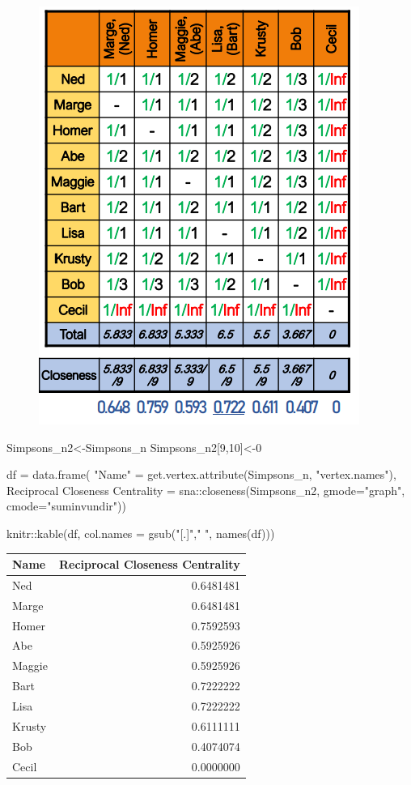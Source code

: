 \documentclass[
  notitlepage,
  onecolumn,
  openany]{book}
\newenvironment{Shaded}{\begin{snugshade}}{\end{snugshade}}
\newcommand{\AttributeTok}[1]{\textcolor[rgb]{0.77,0.63,0.00}{#1}}
\newcommand{\DecValTok}[1]{\textcolor[rgb]{0.00,0.00,0.81}{#1}}
\newcommand{\FunctionTok}[1]{\textcolor[rgb]{0.00,0.00,0.00}{#1}}
\newcommand{\NormalTok}[1]{#1}
\newcommand{\OtherTok}[1]{\textcolor[rgb]{0.56,0.35,0.01}{#1}}
\newcommand{\SpecialCharTok}[1]{\textcolor[rgb]{0.00,0.00,0.00}{#1}}
\newcommand{\StringTok}[1]{\textcolor[rgb]{0.31,0.60,0.02}{#1}}
\begin{document}
\begin{figure}[h!]

{\centering \includegraphics[width=0.5\linewidth]{images/04-Centrality/Untitled 3} 

}

\end{figure}

\begin{Shaded}
\begin{Highlighting}[]
\NormalTok{Simpsons\_n2}\OtherTok{\textless{}{-}}\NormalTok{Simpsons\_n}
\NormalTok{Simpsons\_n2[}\DecValTok{9}\NormalTok{,}\DecValTok{10}\NormalTok{]}\OtherTok{\textless{}{-}}\DecValTok{0}

\NormalTok{df }\OtherTok{=} \FunctionTok{data.frame}\NormalTok{(}
    \StringTok{"Name"} \OtherTok{=} \FunctionTok{get.vertex.attribute}\NormalTok{(Simpsons\_n, }\StringTok{"vertex.names"}\NormalTok{),}
    \StringTok{\textasciigrave{}}\AttributeTok{Reciprocal Closeness Centrality}\StringTok{\textasciigrave{}} \OtherTok{=}\NormalTok{ sna}\SpecialCharTok{::}\FunctionTok{closeness}\NormalTok{(Simpsons\_n2, }\AttributeTok{gmode=}\StringTok{"graph"}\NormalTok{, }\AttributeTok{cmode=}\StringTok{"suminvundir"}\NormalTok{))}

\NormalTok{knitr}\SpecialCharTok{::}\FunctionTok{kable}\NormalTok{(df, }\AttributeTok{col.names =} \FunctionTok{gsub}\NormalTok{(}\StringTok{"[.]"}\NormalTok{,}\StringTok{" "}\NormalTok{, }\FunctionTok{names}\NormalTok{(df)))}
\end{Highlighting}
\end{Shaded}

\begin{tabular}{l|r}
\hline
Name & Reciprocal Closeness Centrality\\
\hline
Ned & 0.6481481\\
\hline
Marge & 0.6481481\\
\hline
Homer & 0.7592593\\
\hline
Abe & 0.5925926\\
\hline
Maggie & 0.5925926\\
\hline
Bart & 0.7222222\\
\hline
Lisa & 0.7222222\\
\hline
Krusty & 0.6111111\\
\hline
Bob & 0.4074074\\
\hline
Cecil & 0.0000000\\
\hline
\end{tabular}
\end{document}
